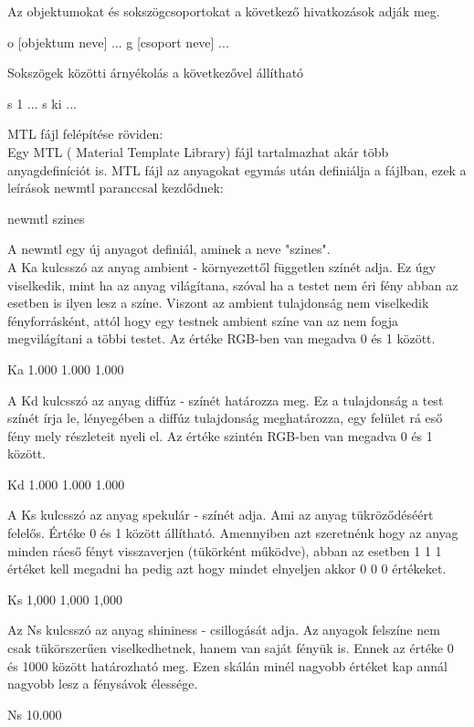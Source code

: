 Az objektumokat és sokszögcsoportokat a következő hivatkozások adják meg.
\begin{python}
o [objektum neve]
  ...
  g [csoport neve]
  ...
\end{python}
\bigskip
Sokszögek közötti árnyékolás a következővel állítható
\begin{python}
s 1
  ...
  s ki
  ...
\end{python}

MTL fájl felépítése röviden:\\

Egy MTL ( Material Template Library) fájl tartalmazhat akár több anyagdefiníciót is. MTL fájl az anyagokat egymás után definiálja a fájlban, ezek a leírások newmtl paranccsal kezdődnek:
\begin{python}
newmtl szines
\end{python}
\bigskip
A newmtl egy új anyagot definiál, aminek a neve "szines".\\
A Ka kulcsszó az anyag ambient - környezettől független színét adja. Ez úgy viselkedik, mint ha az anyag világítana, szóval ha a testet nem éri fény abban az esetben is ilyen lesz a színe. Viszont  az ambient tulajdonság nem viselkedik fényforrásként, attól hogy egy testnek ambient színe van az nem fogja megvilágítani a többi testet. Az értéke RGB-ben van megadva 0 és 1 között.
\begin{python}
Ka 1.000 1.000 1.000
\end{python}
\bigskip
A Kd kulcsszó az anyag diffúz -  színét határozza meg. Ez a tulajdonság a test színét írja le, lényegében a diffúz tulajdonság meghatározza, egy felület rá eső fény mely részleteit nyeli el. Az értéke szintén RGB-ben van megadva 0 és 1 között.
\begin{python}
Kd 1.000 1.000 1.000
\end{python}
\bigskip
A Ks kulcsszó az anyag spekulár - színét adja. Ami az anyag tükröződéséért felelős. Értéke 0 és 1 között állítható. Amennyiben azt szeretnénk hogy az anyag minden ráeső fényt visszaverjen (tükörként működve), abban az esetben 1 1 1 értéket kell megadni ha pedig azt hogy mindet elnyeljen akkor 0 0 0 értékeket.
\begin{python}
Ks 1,000 1,000 1,000
\end{python}
\bigskip
Az Ns kulcsszó az anyag shininess - csillogását adja. Az anyagok felszíne nem csak tükörszerűen viselkedhetnek, hanem van saját fényük is. Ennek az értéke 0 és 1000 között határozható meg. Ezen skálán minél nagyobb értéket kap annál nagyobb lesz a fénysávok élessége.
\begin{python}
Ns 10.000
\end{python}

